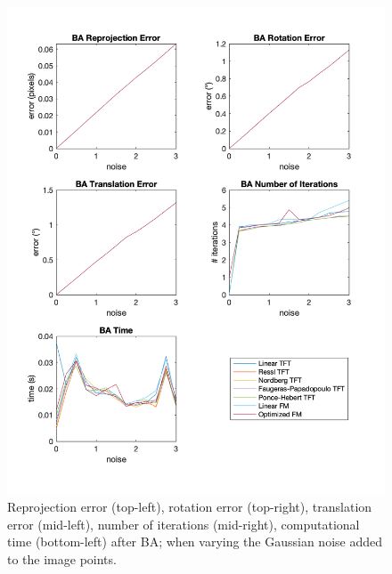 \begin{figure}[p]
	\centering
	\includegraphics[width=1\textwidth]{Experiments/Synthetic/noise/BAnoisePlots.png}
	\caption[Synthetic Trial varying Gaussian Noise with \acs{BA}]{Reprojection error (top-left), rotation error (top-right), translation error (mid-left), number of iterations (mid-right), computational time (bottom-left) after \acs{BA}; when varying the Gaussian noise added to the image points.}
	\label{fig:BANoisePlot}
\end{figure}

